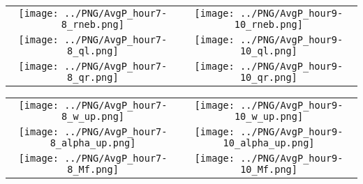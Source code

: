 \documentclass{article}
\begin{document}
\newpage

\begin{table}
  \begin{tabular}{cc}
     \texttt{[image: ../PNG/AvgP\_hour7-8\_rneb.png]} & \texttt{[image: ../PNG/AvgP\_hour9-10\_rneb.png]} \\
     \texttt{[image: ../PNG/AvgP\_hour7-8\_ql.png]}   & \texttt{[image: ../PNG/AvgP\_hour9-10\_ql.png]}  \\
     \texttt{[image: ../PNG/AvgP\_hour7-8\_qr.png]}   & \texttt{[image: ../PNG/AvgP\_hour9-10\_qr.png]}
  \end{tabular}
\end{table}

\newpage





\begin{table}
  \begin{tabular}{cc}
     \texttt{[image: ../PNG/AvgP\_hour7-8\_w\_up.png]}     & \texttt{[image: ../PNG/AvgP\_hour9-10\_w\_up.png]}     \\
     \texttt{[image: ../PNG/AvgP\_hour7-8\_alpha\_up.png]} & \texttt{[image: ../PNG/AvgP\_hour9-10\_alpha\_up.png]} \\
     \texttt{[image: ../PNG/AvgP\_hour7-8\_Mf.png]}       & \texttt{[image: ../PNG/AvgP\_hour9-10\_Mf.png]}
  \end{tabular}
\end{table}
\end{document}
